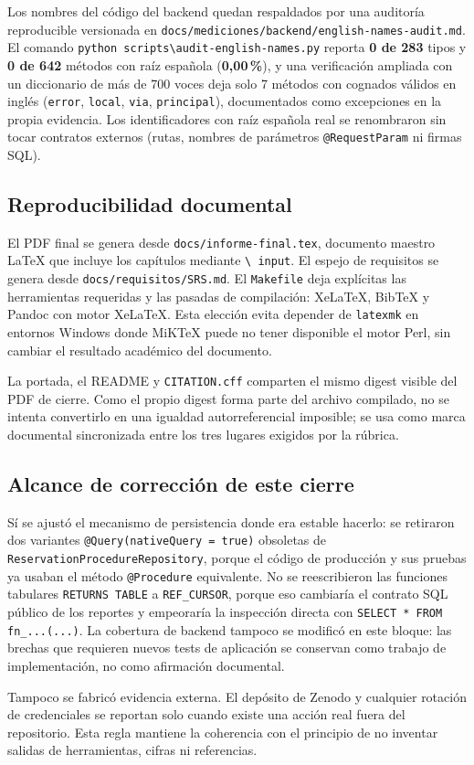 Los nombres del código del backend quedan respaldados por una auditoría
reproducible versionada en
\texttt{docs/mediciones/backend/english-names-audit.md}. El comando
\texttt{python scripts\textbackslash audit-english-names.py} reporta
\textbf{0 de 283} tipos y \textbf{0 de 642} métodos con raíz española
(\textbf{0,00\,\%}), y una verificación ampliada con un diccionario de
más de 700 voces deja solo 7 métodos con cognados válidos en inglés
(\texttt{error}, \texttt{local}, \texttt{via}, \texttt{principal}),
documentados como excepciones en la propia evidencia. Los identificadores
con raíz española real se renombraron sin tocar contratos externos
(rutas, nombres de parámetros \texttt{@RequestParam} ni firmas SQL).

\subsection*{Reproducibilidad documental}

El PDF final se genera desde \texttt{docs/informe-final.tex}, documento
maestro LaTeX que incluye los capítulos mediante \texttt{\textbackslash
input}. El espejo de requisitos se genera desde
\texttt{docs/requisitos/SRS.md}. El \texttt{Makefile} deja explícitas las
herramientas requeridas y las pasadas de compilación: XeLaTeX, BibTeX y
Pandoc con motor XeLaTeX. Esta elección evita depender de \texttt{latexmk}
en entornos Windows donde MiKTeX puede no tener disponible el motor Perl,
sin cambiar el resultado académico del documento.

La portada, el README y \texttt{CITATION.cff} comparten el mismo digest
visible del PDF de cierre. Como el propio digest forma parte del archivo
compilado, no se intenta convertirlo en una igualdad autorreferencial
imposible; se usa como marca documental sincronizada entre los tres
lugares exigidos por la rúbrica.

\subsection*{Alcance de corrección de este cierre}

Sí se ajustó el mecanismo de persistencia donde era estable hacerlo: se
retiraron dos variantes \texttt{@Query(nativeQuery = true)} obsoletas de
\texttt{ReservationProcedureRepository}, porque el código de producción y
sus pruebas ya usaban el método \texttt{@Procedure} equivalente. No se
reescribieron las funciones tabulares \texttt{RETURNS TABLE} a
\texttt{REF\_CURSOR}, porque eso cambiaría el contrato SQL público de los
reportes y empeoraría la inspección directa con \texttt{SELECT * FROM
fn\_...(...)}. La cobertura de backend tampoco se modificó en este bloque:
las brechas que requieren nuevos tests de aplicación se conservan como
trabajo de implementación, no como afirmación documental.

Tampoco se fabricó evidencia externa. El depósito de Zenodo y cualquier
rotación de credenciales se reportan solo cuando existe una acción real
fuera del repositorio. Esta regla mantiene la coherencia con el principio
de no inventar salidas de herramientas, cifras ni referencias.

